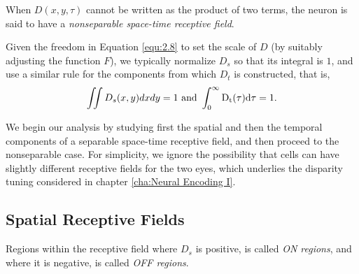 \begin{rem}
  When $D(x,y,\tau)$ cannot be written as the product of two terms, the neuron is said to have a \emph{nonseparable space-time receptive field}.
\end{rem}

\begin{asm}[Normalization]
  \label{asm:Normalized}
  Given the freedom in Equation \ref{equ:2.8} to set the scale of $D$ (by suitably adjusting the function $F$), we typically normalize $D_s$ so that its integral is $1$, and use a similar rule for the components from which $D_t$ is constructed, that is,
  \begin{displaymath}
    \iint D_s(x,y)dxdy = 1 \ \rm{and} \ \int_0^{\infty}D_t(\tau)d\tau = 1.
  \end{displaymath}
\end{asm}

\begin{rem}
  We begin our analysis by studying first the spatial and then the temporal components of a separable space-time receptive field, and then proceed to the nonseparable case. For simplicity, we ignore the possibility that cells can have slightly different receptive fields for the two eyes, which underlies the disparity tuning considered in chapter \ref{cha:Neural Encoding I}.
\end{rem}

\subsection{Spatial Receptive Fields}
\label{sec:SpatialReceptiveFields}

\begin{defn}
  \label{def:regions}
  Regions within the receptive field where $D_s$ is positive, is called \emph{ON regions}, and where it is negative, is called \emph{OFF regions}.
\end{defn}

